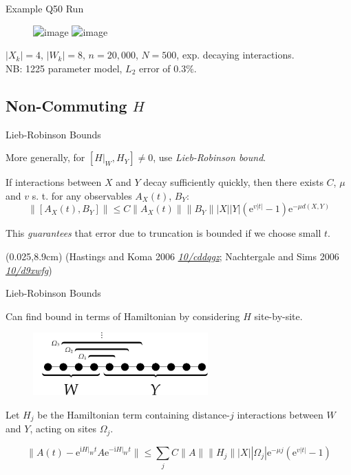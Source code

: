 \documentclass[xcolor=dvipsnames, compress]{beamer}
\renewcommand\UrlFont{\color{red}\rmfamily\itshape}
\newcommand{\shortdoi}[1]{\href{http://doi.org/#1}{\UrlFont 10/#1}}
\newcommand{\ee}{\mathrm{e}}
\newcommand{\ii}{\mathrm{i}}
\newcommand{\bottomnote}[1]{
  \begin{textblock*}{0.95\paperwidth} (0.025\paperwidth,8.9cm)
    {\tiny \hfill #1}
  \end{textblock*}
}
\begin{document}
\begin{frame}{Example Q50 Run}

  \begin{figure}
    \centering
    \includegraphics<1>[width=1\textwidth]{8outc2a-hist}
    \includegraphics<2>[width=0.5\textwidth]{q50-comparison}
  \end{figure}

  $|X_k| = 4$, $|W_k| = 8$, $n = 20,000$, $N = 500$, exp. decaying interactions.\\
  NB: 1225 parameter model, $L_2$ error of $0.3\%$.

\end{frame}

\subsection{Non-Commuting $H$}

\begin{frame}{Lieb-Robinson Bounds}

  More generally, for $[H|_W, H_Y] \ne 0$, use \emph{Lieb-Robinson bound}.

  If interactions between $X$ and $Y$ decay sufficiently quickly,
  then there exists $C$, $\mu$ and $v$ s. t. for any observables $A_X(t)$, $B_Y$:
  $$
    \|[A_X(t), B_Y]\| \le C \|A_X(t)\| \|B_Y\| |X| |Y| (\ee^{v|t|} - 1) \ee^{-\mu d(X, Y)}
  $$

  This \emph{guarantees} that error due to truncation is bounded if
  we choose small $t$.

  \bottomnote{(Hastings and Koma 2006 \shortdoi{cddqgz}; Nachtergale and Sims 2006 \shortdoi{d9xwfg})}

\end{frame}

\begin{frame}{Lieb-Robinson Bounds}

  Can find bound in terms of Hamiltonian by considering $H$ site-by-site.

  \begin{figure}
    \centering
    \includegraphics[width=0.6\textwidth]{bootstrapping-partition-distance}
  \end{figure}

  Let $H_j$ be the Hamiltonian term containing distance-$j$
  interactions between $W$ and $Y$, acting on sites $\Omega_j$.

  $$
    \|A(t) - \ee^{\ii H|_W t} A \ee^{-\ii H|_W t} \| \le
    \sum_{j} C \|A\| \|H_j\| |X| |\Omega_j| \ee^{-\mu j} (\ee^{v |t|} - 1)
  $$

\end{frame}
\end{document}
